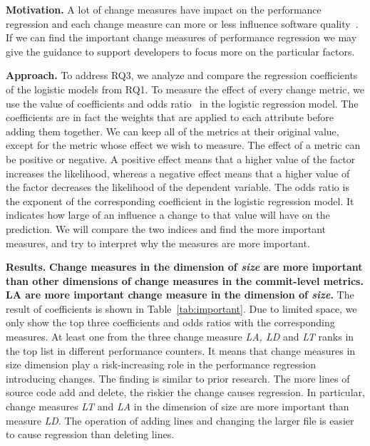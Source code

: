 \textbf{Motivation.}
A lot of change measures have impact on the performance regression and each change measure can more or less influence software quality~\cite{emadjit}. If we can find the important change measures of performance regression we may give the guidance to support developers to focus more on the particular factors.

\textbf{Approach.}
To address RQ3, we analyze and compare the regression coefficients of the logistic models from RQ1. To measure the effect of every change metric, we use the value of coefficients and odds ratio~\cite{Shihab:2010} in the logistic regression model. The coefficients are in fact the weights that are applied to each attribute before adding them together. We can keep all of the metrics at their original value, except for the metric whose effect we wish to measure. %
The effect of a metric can be positive or negative. A positive effect means that a higher value of the factor increases the likelihood, whereas a negative effect means that a higher value of the factor decreases the likelihood of the dependent variable. The odds ratio is the exponent of the corresponding coefficient in the logistic regression model. It indicates how large of an influence a change to that value will have on the prediction. We will compare the two indices and find the more important measures, and try to interpret why the measures are more important.

\textbf{Results.} \textbf{Change measures in the dimension of \emph{size} are more important than other dimensions of change measures in the commit-level metrics. LA are more important change measure in the dimension of \emph{size}.} The result of  coefficients is shown in Table~\ref{tab:important}. Due to limited space, we only show the top three coefficients and odds ratios with the corresponding measures. At least one from the  three change measure \emph{LA, LD} and \emph{LT} ranks in the top list in different performance counters. It means that change measures in size dimension play a risk-increasing role in the performance regression introducing changes. The finding is similar to prior research. The more lines of source code add and delete, the riskier the change causes regression. In particular, change measures \emph{LT} and \emph{LA} in the dimension of size are more important than measure \emph{LD}. The operation of adding lines and changing the larger file is easier to cause regression than deleting lines.

